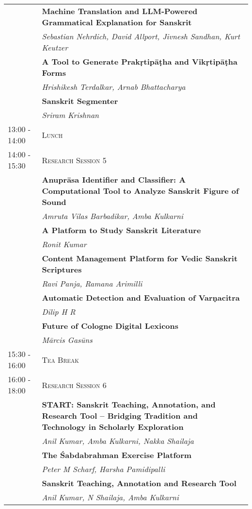 \begin{longtable}{|p{}|p{}|}
\hline
 & \textbf{Machine Translation and LLM-Powered Grammatical Explanation for Sanskrit}\\*
 & \textit{Sebastian Nehrdich, David Allport, Jivnesh Sandhan, Kurt Keutzer}\\
\hline
 & \textbf{A Tool to Generate Prakṛtipāṭha and Vikṛtipāṭha Forms}\\*
 & \textit{Hrishikesh Terdalkar, Arnab Bhattacharya}\\
\hline
 & \textbf{Sanskrit Segmenter}\\*
 & \textit{Sriram Krishnan}\\
\hline
\rowcolor{Gold1!45!} 13:00  - 14:00 & \textsc{Lunch}\\*
\hline
\rowcolor{OliveDrab3!45!} 14:00  - 15:30 & \textsc{Research Session 5}\\*
\hline
 & \textbf{Anuprāsa Identifier and Classifier: A Computational Tool to Analyze Sanskrit Figure of Sound}\\*
 & \textit{Amruta Vilas Barbadikar, Amba Kulkarni}\\
\hline
 & \textbf{A Platform to Study Sanskrit Literature}\\*
 & \textit{Ronit Kumar}\\
\hline
 & \textbf{Content Management Platform for Vedic Sanskrit Scriptures}\\*
 & \textit{Ravi Panja, Ramana Arimilli}\\
\hline
 & \textbf{Automatic Detection and Evaluation of Varṇacitra}\\*
 & \textit{Dilip H R}\\
\hline
 & \textbf{Future of Cologne Digital Lexicons}\\*
 & \textit{Mārcis Gasūns}\\
\hline
\rowcolor{Gold1!45!} 15:30  - 16:00 & \textsc{Tea Break}\\*
\hline
\rowcolor{OliveDrab3!45!} 16:00  - 18:00 & \textsc{Research Session 6}\\*
\hline
 & \textbf{START: Sanskrit Teaching, Annotation, and Research Tool -- Bridging Tradition and Technology in Scholarly Exploration}\\*
 & \textit{Anil Kumar, Amba Kulkarni, Nakka Shailaja}\\
\hline
 & \textbf{The Śabdabrahman Exercise Platform}\\*
 & \textit{Peter M Scharf, Harsha Pamidipalli}\\
\hline
 & \textbf{Sanskrit Teaching, Annotation and Research Tool}\\*
 & \textit{Anil Kumar, N Shailaja, Amba Kulkarni}\\

\end{longtable}
